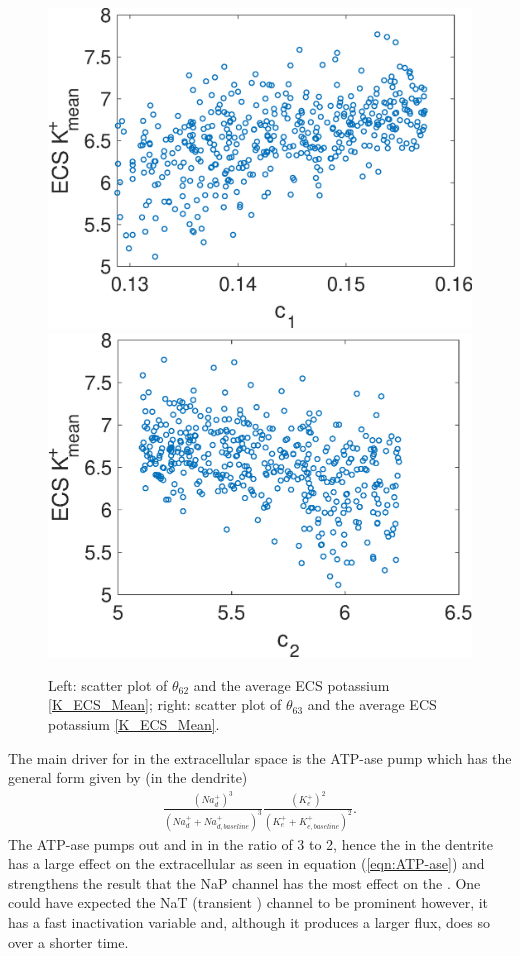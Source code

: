 \begin{figure}
\centering
\includegraphics[width=0.49\linewidth]{Figures/Scatter_62_K_ECS}
\includegraphics[width=0.48\linewidth]{Figures/Scatter_63_K_ECS}
\caption{Left: scatter plot of $\theta_{62}$ and the average ECS potassium \eqref{K_ECS_Mean}; right: scatter plot of $\theta_{63}$ and the average ECS potassium \eqref{K_ECS_Mean}.}
\label{fig:scatter}
\end{figure}
The main driver for \pot in the extracellular space is the \pot \na ATP-ase pump which has the general form given by (in the dendrite)  
\begin{eqnarray}\label{eqn:ATP-ase}
\frac{(Na^{+}_{d})^3}{\left( Na^{+}_{d}+Na^{+}_{d,baseline}\right)^3}\frac{(K^{+}_e)^{2}}{\left( K^+_e +K^+_{e,baseline}\right) ^2}.
\end{eqnarray}
The ATP-ase pumps out \na and in \pot in the ratio of 3 to 2, hence the \na in the dentrite has a large effect on the extracellular \pot as seen in equation (\ref{eqn:ATP-ase}) and strengthens the result that the NaP channel has the most effect on the \pot. One could have expected the NaT (transient \na) channel to be prominent however, it has a fast inactivation variable and, although it produces a larger flux, does so over a shorter time.  
